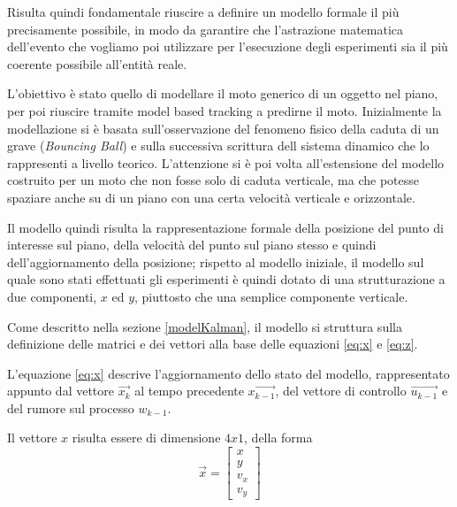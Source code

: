 Risulta quindi fondamentale riuscire a definire un modello formale il più precisamente possibile, in modo da garantire che l'astrazione matematica dell'evento che vogliamo poi utilizzare per l'esecuzione degli esperimenti sia il più coerente possibile all'entità reale. 

L'obiettivo è stato quello di modellare il moto generico di un oggetto nel piano, per poi riuscire tramite model based tracking a predirne il moto. Inizialmente la modellazione si è basata sull'osservazione del fenomeno fisico della caduta di un grave (\textit{Bouncing Ball}) e sulla successiva scrittura dell sistema dinamico che lo rappresenti a livello teorico. L'attenzione si è poi volta all'estensione del modello costruito per un moto che non fosse solo di caduta verticale, ma che potesse spaziare anche su di un piano con una certa velocità verticale e orizzontale. 

Il modello quindi risulta la rappresentazione formale della posizione del punto di interesse sul piano, della velocità del punto sul piano stesso e quindi dell'aggiornamento della posizione; rispetto al modello iniziale, il modello sul quale sono stati effettuati gli esperimenti è quindi dotato di una strutturazione a due componenti, $x$ ed $y$, piuttosto che una semplice componente verticale.%

Come descritto nella sezione \ref{modelKalman}, il modello si struttura sulla definizione delle matrici e dei vettori alla base delle equazioni \ref{eq:x} e \ref{eq:z}.

L'equazione \ref{eq:x} descrive l'aggiornamento dello stato del modello, rappresentato appunto dal vettore $\overrightarrow{x_k}$ al tempo precedente $\overrightarrow{x_{k-1}}$, del vettore di controllo $\overrightarrow{u_{k-1}}$ e del rumore sul processo $w_{k-1}$. 

Il vettore $x$ risulta essere di dimensione $4 x 1$, della forma 
\begin{equation}\label{eq:vettoreX}
 \overrightarrow{x}=\begin{bmatrix} x \\ y \\ v_x \\ v_y \end{bmatrix}
\end{equation} 

